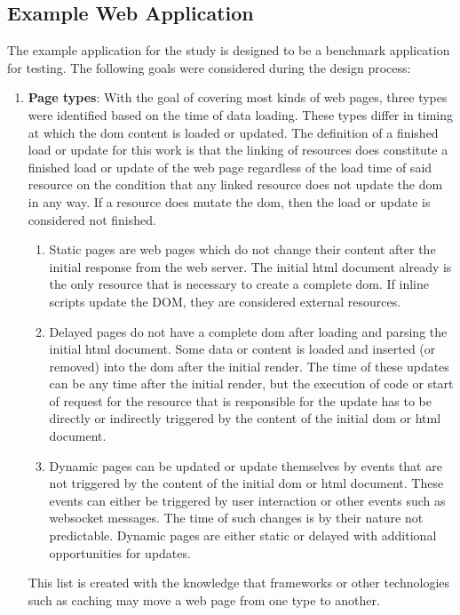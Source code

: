 \documentclass[a4paper, 12pt]{article}
\begin{document}
\subsection{Example Web Application}\label{subsec:exampleapplication}
%
% 

The example application for the study is designed to be a benchmark application for testing.
The following goals were considered during the design process:

\begin{enumerate}
  \item \textbf{Page types}: With the goal of covering most kinds of web pages, three types were identified based on the time of data loading.\label{enum:pagetypes}
  These types differ in timing at which the \acrshort{dom} content is loaded or updated.
  The definition of a finished load or update for this work is that the linking of resources does constitute a finished load or update of the web page regardless of the load time of said resource on the condition that any linked resource does not update the \acrshort{dom} in any way.
  If a resource does mutate the \acrshort{dom}, then the load or update is considered not finished.
  \begin{enumerate}
    \item Static pages are web pages which do not change their content after the initial response from the web server.
    The initial \acrshort{html} document already is the only resource that is necessary to create a complete \acrshort{dom}.
    If inline scripts update the DOM, they are considered external resources.
    \item Delayed pages do not have a complete \acrshort{dom} after loading and parsing the initial \acrshort{html} document.
    Some data or content is loaded and inserted (or removed) into the \acrshort{dom} after the initial render.
    The time of these updates can be any time after the initial render, but the execution of code or start of request for the resource that is responsible for the update has to be directly or indirectly triggered by the content of the initial \acrshort{dom} or \acrshort{html} document.
    \item Dynamic pages can be updated or update themselves by events that are not triggered by the content of the initial \acrshort{dom} or \acrshort{html} document.
    These events can either be triggered by user interaction or other events such as websocket messages.
    The time of such changes is by their nature not predictable.
    Dynamic pages are either static or delayed with additional opportunities for updates.
  \end{enumerate}
  This list is created with the knowledge that frameworks or other technologies such as caching may move a web page from one type to another.


\end{enumerate}
\end{document}
